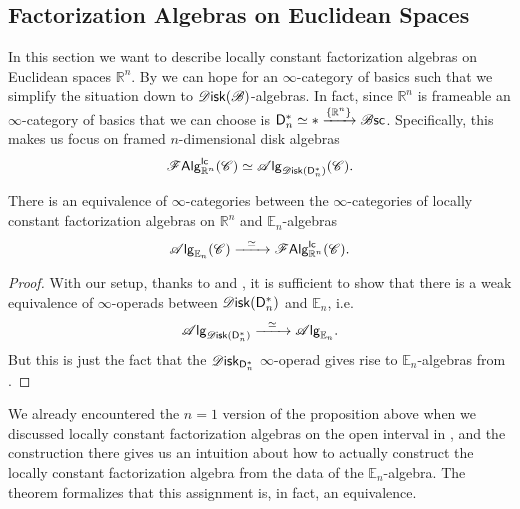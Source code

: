 \documentclass[../text]{subfiles}
\begin{document}
\subsection{Factorization Algebras on Euclidean Spaces}\label{ssec:lcfa_on_Rn}

In this section we want to describe locally constant factorization algebras on Euclidean spaces $\mathbb{R}^n$. By  we can hope for an $\infty$-category of basics such that we simplify the situation down to $\disk (\bstr)$-algebras. In fact, since $\mathbb{R}^n$ is frameable an $\infty$-category of basics that we can choose is $\mathsf{D}_n^* \simeq * \xrightarrow{\{ \mathbb{R}^n\}} \mathscr{B} \mathsf{sc}$. Specifically, this makes us focus on framed $n$-dimensional disk algebras
%
\begin{equation}
    \lcfa_{\mathbb{R}^n} (\catC) \simeq \alg{\disk (\mathsf{D}_n^*)} (\catC).
\end{equation}
%

\begin{theorem}
    There is an equivalence of $\infty$-categories between the $\infty$-categories of locally constant factorization algebras on $\mathbb{R}^n$ and $\mathbb{E}_n$-algebras
    \begin{equation}
        \alg{\mathbb{E}_n} (\catC) \xrightarrow{\ \ \simeq \ \ } \lcfa_{\mathbb{R}^n} (\catC).
    \end{equation}
\end{theorem}

\begin{proof}
    With our setup, thanks to  and , it is sufficient to show that there is a weak equivalence of $\infty$-operads between $\disk (\mathsf{D}_n^*)$ and $\mathbb{E}_n$, i.e.
    \begin{equation}
        \alg{\disk (\mathsf{D}_n^*)} \xrightarrow{\ \ \simeq \ \ } \alg{\mathbb{E}_n}.
    \end{equation}
    But this is just the fact that the $\disk_{\mathsf{D}_n^*}$ $\infty$-operad gives rise to $\mathbb{E}_n$-algebras from .
\end{proof}

\begin{remark}
    We already encountered the $n=1$ version of the proposition above when we discussed locally constant factorization algebras on the open interval in , and the construction there gives us an intuition about how to actually construct the locally constant factorization algebra from the data of the $\mathbb{E}_n$-algebra. The theorem formalizes that this assignment is, in fact, an equivalence.
\end{remark}
\end{document}
